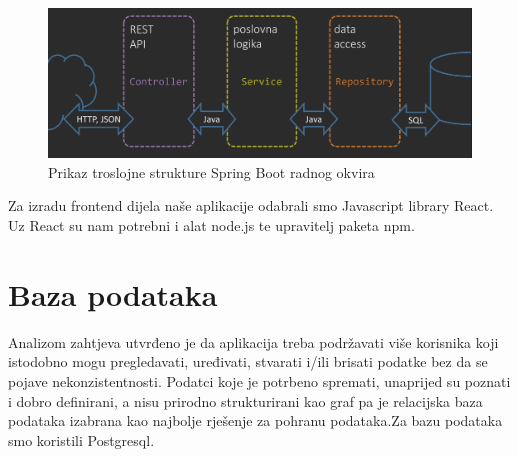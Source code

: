 	\begin{figure}[H]
        \centering
        \includegraphics[width=\textwidth]{img/SpringBootflowArchitecture.png}
        \caption{Prikaz troslojne strukture Spring Boot radnog okvira}
    \end{figure}
	\hfill\break
	Za izradu frontend dijela naše aplikacije odabrali smo Javascript library React. Uz React su nam potrebni i alat node.js te upravitelj paketa npm.  

    \section{Baza podataka}
    Analizom zahtjeva utvrđeno je da aplikacija treba podržavati više korisnika koji istodobno mogu pregledavati, uređivati, stvarati i/ili brisati podatke bez da se pojave nekonzistentnosti. Podatci koje je potrbeno spremati, unaprijed su poznati i dobro definirani, a nisu prirodno strukturirani kao graf pa je relacijska baza podataka izabrana kao najbolje rješenje za pohranu podataka.Za bazu podataka smo koristili Postgresql.
    \eject
    
